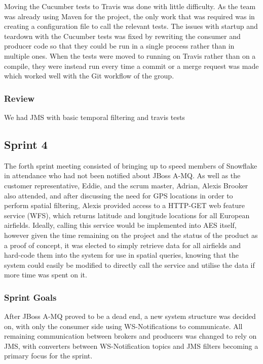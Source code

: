 \documentclass[a4paper, 12pt]{article}
\begin{document}
Moving the Cucumber tests to Travis was done with little difficulty. As the team was already using Maven for the project, the only work that was required was in creating a configuration file to call the relevant tests. The issues with startup and teardown with the Cucumber tests was fixed by rewriting the consumer and producer code so that they could be run in a single process rather than in multiple ones. When the tests were moved to running on Travis rather than on a compile, they were instead run every time a commit or a merge request was made which worked well with the Git workflow of the group.

\subsubsection{Review}

We had JMS with basic temporal filtering and travis tests

\subsection{Sprint 4}

The forth sprint meeting consisted of bringing up to speed members of Snowflake in attendance who had not been notified about JBoss A-MQ. As well as the customer representative, Eddie, and the scrum master, Adrian, Alexis Brooker also attended, and after discussing the need for GPS locations in order to perform spatial filtering, Alexis provided access to a HTTP-GET web feature service (WFS), which returns latitude and longitude locations for all European airfields. Ideally, calling this service would be implemented into AES itself, however given the time remaining on the project and the status of the product as a proof of concept, it was elected to simply retrieve data for all airfields and hard-code them into the system for use in spatial queries, knowing that the system could easily be modified to directly call the service and utilise the data if more time was spent on it.

\subsubsection{Sprint Goals}

After JBoss A-MQ proved to be a dead end, a new system structure was decided on, with only the consumer side using WS-Notifications to communicate. All remaining communication between brokers and producers was changed to rely on JMS, with converters between WS-Notification topics and JMS filters becoming a primary focus for the sprint.
\end{document}
